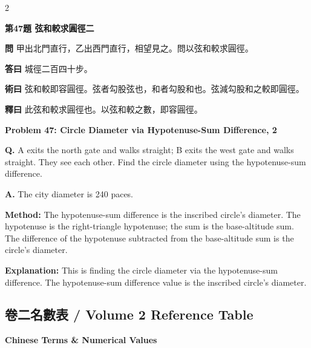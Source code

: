 \documentclass[11pt,a4paper]{article}
\newcommand{\wen}[1]{\noindent\textbf{問} #1\par\smallskip}
\newcommand{\da}[1]{\noindent\textbf{答曰} #1\par\smallskip}
\newcommand{\shu}[1]{\noindent\textbf{術曰} #1\par\smallskip}
\newcommand{\shi}[1]{\noindent\textbf{釋曰} #1\par\smallskip}
\newcommand{\wenE}[1]{\noindent\textbf{Q.} #1\par\smallskip}
\newcommand{\daE}[1]{\noindent\textbf{A.} #1\par\smallskip}
\newcommand{\shuE}[1]{\noindent\textbf{Method:} #1\par\smallskip}
\newcommand{\shiE}[1]{\noindent\textbf{Explanation:} #1\par\smallskip}
\begin{document}
\bigskip

\begin{paracol}{2}

\noindent\textbf{第47題 弦和較求圓徑二}

\wen{甲出北門直行，乙出西門直行，相望見之。問以弦和較求圓徑。}
\da{城徑二百四十步。}
\shu{弦和較即容圓徑。弦者勾股弦也，和者勾股和也。弦減勾股和之較即圓徑。}
\shi{此弦和較求圓徑也。以弦和較之數，即容圓徑。}

\switchcolumn

\noindent\textbf{Problem 47: Circle Diameter via Hypotenuse-Sum Difference, 2}

\wenE{A exits the north gate and walks straight; B exits the west gate and walks straight. They see each other. Find the circle diameter using the hypotenuse-sum difference.}
\daE{The city diameter is 240 paces.}
\shuE{The hypotenuse-sum difference is the inscribed circle's diameter. The hypotenuse is the right-triangle hypotenuse; the sum is the base-altitude sum. The difference of the hypotenuse subtracted from the base-altitude sum is the circle's diameter.}
\shiE{This is finding the circle diameter via the hypotenuse-sum difference. The hypotenuse-sum difference value is the inscribed circle's diameter.}

\end{paracol}

\clearpage

\subsection*{卷二名數表 / Volume 2 Reference Table}

\begin{center}
\textbf{Chinese Terms \& Numerical Values}
\end{center}
\end{document}
